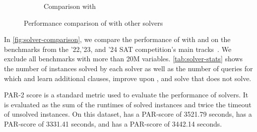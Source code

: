 \begin{figure}[!t]
\begin{subfigure}[t]{0.45\textwidth}
        \caption{Comparison with \prelearn}
        \label{fig:cautical-vs-prelearn}
    \end{subfigure}
    \caption{Performance comparison of \tool with other solvers}
    \label{fig:solver-comparison}
\end{figure}

In \autoref{fig:solver-comparison}, we compare the performance of \tool with \cadical and \prelearn on the benchmarks from the '22,'23, and '24 SAT competition's main tracks~\cite{satcomp2022,satcomp2023,satcomp2024}. We exclude all benchmarks with more than 20M variables. \autoref{tab:solver-stats} shows the number of instances solved by each solver as well as the number of queries for which \prelearn and \cadical learn additional clauses, improve upon \cadical, and solve that \cadical does not solve.

PAR-2 score is a standard metric used to evaluate the performance of solvers.
It is evaluated as the sum of the runtimes of solved instances and twice the timeout of unsolved instances. On this dataset, \cadical has a PAR-score of 3521.79 seconds, \prelearn has a PAR-score of 3331.41 seconds, and \tool has a PAR-score of 3442.14 seconds.


